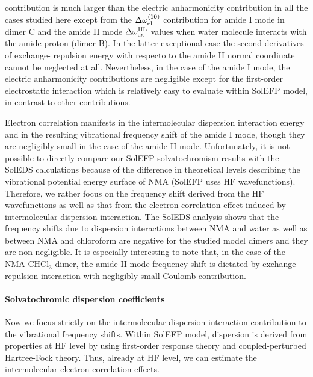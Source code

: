 \documentclass[a4paper,titlepage,twoside,fleqn,12pt]{book}
\begin{document}
\begin{refsection}
contribution is much larger than the electric
anharmonicity contribution in all the cases
studied here except from the $\Delta \omega_{{\rm el}}^{(10)}$ contribution for amide I mode 
in dimer C and the amide II mode
$\Delta \omega_{{\rm ex}}^{\rm HL}$ values when
water molecule interacts with the amide proton
(dimer B).
In the latter exceptional case the second derivatives of exchange\hyp{}
repulsion energy with respecto to the amide II normal coordinate
cannot be neglected at all. 
Nevertheless, in the case of the amide I mode, the
electric anharmonicity contributions are negligible except for
the first\hyp{}order electrostatic interaction
which is relatively easy to evaluate within SolEFP model, in contrast to
other contributions.

Electron correlation manifests in the intermolecular
dispersion interaction energy and in the resulting vibrational
frequency shift of the amide I mode, though they are negligibly
small in the case of the amide II mode. Unfortunately, it is
not possible to directly compare our SolEFP solvatochromism
results with the SolEDS calculations because of the difference
in theoretical levels describing the vibrational potential energy
surface of NMA (SolEFP uses HF wavefunctions). Therefore,
we rather focus on the frequency shift derived from the HF
wavefunctions as well as that from the electron correlation
effect induced by intermolecular dispersion interaction. The
SolEDS analysis shows that the frequency shifts due to dispersion
interactions between NMA and water as well as between
NMA and chloroform are negative for the studied model
dimers and they are non\hyp{}negligible. It is especially interesting
to note that, in the case of the NMA\hyp{}CHCl$_3$ dimer, the amide
II mode frequency shift is dictated by exchange\hyp{}repulsion
interaction with negligibly small Coulomb contribution.

\paragraph{Solvatochromic dispersion coefficients}

Now we focus strictly on the intermolecular dispersion
interaction contribution to the vibrational frequency shifts.
Within SolEFP model, dispersion is derived from properties
at HF level by using first\hyp{}order response theory
and coupled\hyp{}perturbed Hartree\hyp{}Fock theory.
Thus, already at HF level, we can estimate the intermolecular
electron correlation effects.


\end{refsection}
\end{document}
